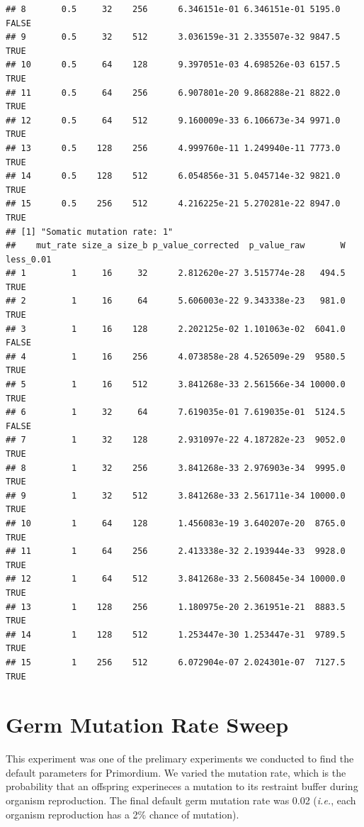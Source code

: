 \documentclass[]{book}
\begin{document}
\begin{verbatim}
## 8       0.5     32    256      6.346151e-01 6.346151e-01 5195.0     FALSE
## 9       0.5     32    512      3.036159e-31 2.335507e-32 9847.5      TRUE
## 10      0.5     64    128      9.397051e-03 4.698526e-03 6157.5      TRUE
## 11      0.5     64    256      6.907801e-20 9.868288e-21 8822.0      TRUE
## 12      0.5     64    512      9.160009e-33 6.106673e-34 9971.0      TRUE
## 13      0.5    128    256      4.999760e-11 1.249940e-11 7773.0      TRUE
## 14      0.5    128    512      6.054856e-31 5.045714e-32 9821.0      TRUE
## 15      0.5    256    512      4.216225e-21 5.270281e-22 8947.0      TRUE
## [1] "Somatic mutation rate: 1"
##    mut_rate size_a size_b p_value_corrected  p_value_raw       W less_0.01
## 1         1     16     32      2.812620e-27 3.515774e-28   494.5      TRUE
## 2         1     16     64      5.606003e-22 9.343338e-23   981.0      TRUE
## 3         1     16    128      2.202125e-02 1.101063e-02  6041.0     FALSE
## 4         1     16    256      4.073858e-28 4.526509e-29  9580.5      TRUE
## 5         1     16    512      3.841268e-33 2.561566e-34 10000.0      TRUE
## 6         1     32     64      7.619035e-01 7.619035e-01  5124.5     FALSE
## 7         1     32    128      2.931097e-22 4.187282e-23  9052.0      TRUE
## 8         1     32    256      3.841268e-33 2.976903e-34  9995.0      TRUE
## 9         1     32    512      3.841268e-33 2.561711e-34 10000.0      TRUE
## 10        1     64    128      1.456083e-19 3.640207e-20  8765.0      TRUE
## 11        1     64    256      2.413338e-32 2.193944e-33  9928.0      TRUE
## 12        1     64    512      3.841268e-33 2.560845e-34 10000.0      TRUE
## 13        1    128    256      1.180975e-20 2.361951e-21  8883.5      TRUE
## 14        1    128    512      1.253447e-30 1.253447e-31  9789.5      TRUE
## 15        1    256    512      6.072904e-07 2.024301e-07  7127.5      TRUE
\end{verbatim}

\hypertarget{germ-mutation-rate-sweep}{%
\chapter{Germ Mutation Rate Sweep}\label{germ-mutation-rate-sweep}}

This experiment was one of the prelimary experiments we conducted to find the default parameters for Primordium.
We varied the mutation rate, which is the probability that an offspring experineces a mutation to its restraint buffer during organism reproduction.
The final default germ mutation rate was 0.02 (\emph{i.e.}, each organism reproduction has a 2\% chance of mutation).
\end{document}
